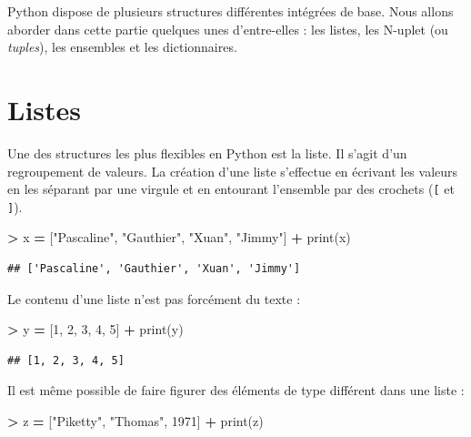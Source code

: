 \documentclass[12pt,]{book}
\newenvironment{Shaded}{\begin{snugshade}}{\end{snugshade}}
\newcommand{\DecValTok}[1]{\textcolor[rgb]{0.00,0.00,0.81}{#1}}
\newcommand{\StringTok}[1]{\textcolor[rgb]{0.31,0.60,0.02}{#1}}
\newcommand{\OperatorTok}[1]{\textcolor[rgb]{0.81,0.36,0.00}{\textbf{#1}}}
\newcommand{\BuiltInTok}[1]{#1}
\newcommand{\NormalTok}[1]{#1}
\numberwithin{equation}{section}
\numberwithin{countremarque}{section}
\begin{document}
Python dispose de plusieurs structures différentes intégrées de base.
Nous allons aborder dans cette partie quelques unes d'entre-elles : les
listes, les N-uplet (ou \emph{tuples}), les ensembles et les
dictionnaires.

\section{Listes}\label{structures-listes}

Une des structures les plus flexibles en Python est la liste. Il s'agit
d'un regroupement de valeurs. La création d'une liste s'effectue en
écrivant les valeurs en les séparant par une virgule et en entourant
l'ensemble par des crochets (\texttt{{[}} et \texttt{{]}}).

\begin{Shaded}
\begin{Highlighting}[]
\OperatorTok{>}\NormalTok{ x }\OperatorTok{=}\NormalTok{ [}\StringTok{"Pascaline"}\NormalTok{, }\StringTok{"Gauthier"}\NormalTok{, }\StringTok{"Xuan"}\NormalTok{, }\StringTok{"Jimmy"}\NormalTok{]}
\OperatorTok{+} \BuiltInTok{print}\NormalTok{(x)}
\end{Highlighting}
\end{Shaded}

\begin{lstlisting}
## ['Pascaline', 'Gauthier', 'Xuan', 'Jimmy']
\end{lstlisting}

Le contenu d'une liste n'est pas forcément du texte :

\begin{Shaded}
\begin{Highlighting}[]
\OperatorTok{>}\NormalTok{ y }\OperatorTok{=}\NormalTok{ [}\DecValTok{1}\NormalTok{, }\DecValTok{2}\NormalTok{, }\DecValTok{3}\NormalTok{, }\DecValTok{4}\NormalTok{, }\DecValTok{5}\NormalTok{]}
\OperatorTok{+} \BuiltInTok{print}\NormalTok{(y)}
\end{Highlighting}
\end{Shaded}

\begin{lstlisting}
## [1, 2, 3, 4, 5]
\end{lstlisting}

Il est même possible de faire figurer des éléments de type différent
dans une liste :

\begin{Shaded}
\begin{Highlighting}[]
\OperatorTok{>}\NormalTok{ z }\OperatorTok{=}\NormalTok{ [}\StringTok{"Piketty"}\NormalTok{, }\StringTok{"Thomas"}\NormalTok{, }\DecValTok{1971}\NormalTok{]}
\OperatorTok{+} \BuiltInTok{print}\NormalTok{(z)}
\end{Highlighting}
\end{Shaded}
\end{document}
